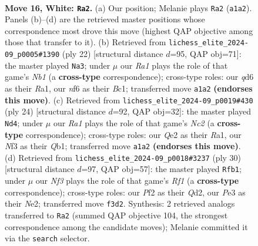 \documentclass[11pt]{article}
\begin{document}
\clearpage

\begin{figure}[p]\centering
\begin{subfigure}{0.46\textwidth}\centering
\resizebox{\linewidth}{!}{%
\newchessgame
\chessboard[
  setfen={rnb1kr2/p3b1pp/1p1q1n2/3p1p2/1p1P3P/P3PNPB/4QP2/RNB1R1K1 w - - 0 16},
  showmover=false,
  pgfstyle=straightmove, color=movearrow, markmove={a1-a2}
]}
\caption{}
\end{subfigure}\hfill
\begin{subfigure}{0.46\textwidth}\centering
\resizebox{\linewidth}{!}{%
\newchessgame
\chessboard[
  setfen={r2qk2r/1b1nbppp/p2ppn2/1p6/P3P3/2PB1N2/1P3PPP/RNBQR1K1 w kq - 1 12},
  showmover=false,
  pgfstyle=straightmove, color=movearrow, markmove={b1-a3}
]}
\caption{}
\end{subfigure}
\\[4pt]
\begin{subfigure}{0.46\textwidth}\centering
\resizebox{\linewidth}{!}{%
\newchessgame
\chessboard[
  setfen={r1b1k1nr/ppp2ppq/3b4/4n2p/2B1pN1P/1P2P3/PBNP1PP1/RQ2K2R w KQkq - 11 13},
  showmover=false,
  pgfstyle=straightmove, color=movearrow, markmove={c2-d4}
]}
\caption{}
\end{subfigure}\hfill
\begin{subfigure}{0.46\textwidth}\centering
\resizebox{\linewidth}{!}{%
\newchessgame
\chessboard[
  setfen={rr6/4ppbk/nq1p1npp/2pP4/4P2P/2N1BP2/PP1QN1P1/R4RK1 w - - 4 16},
  showmover=false,
  pgfstyle=straightmove, color=movearrow, markmove={f1-b1}
]}
\caption{}
\end{subfigure}
\caption{\textbf{Move 16, White: \texttt{Ra2}.} (a) Our position; Melanie plays \texttt{Ra2} (\texttt{a1a2}). Panels (b)--(d) are the retrieved master positions whose correspondence most drove this move (highest QAP objective among those that transfer to it). (b) Retrieved from \texttt{lichess\_elite\_2024-09\_p0005\#1390} (ply 22) [structural distance $d$=95, QAP obj=71]: the master played \texttt{Na3}; under $\mu$ our \emph{Ra1} plays the role of that game's \emph{Nb1} (a \textbf{cross-type} correspondence); cross-type roles: our \emph{q}d6 as their \emph{R}a1, our \emph{n}f6 as their \emph{B}c1; transferred move \texttt{a1a2} \textbf{(endorses this move)}. (c) Retrieved from \texttt{lichess\_elite\_2024-09\_p0019\#430} (ply 24) [structural distance $d$=92, QAP obj=32]: the master played \texttt{Nd4}; under $\mu$ our \emph{Ra1} plays the role of that game's \emph{Nc2} (a \textbf{cross-type} correspondence); cross-type roles: our \emph{Q}e2 as their \emph{R}a1, our \emph{N}f3 as their \emph{Q}b1; transferred move \texttt{a1a2} \textbf{(endorses this move)}. (d) Retrieved from \texttt{lichess\_elite\_2024-09\_p0018\#3237} (ply 30) [structural distance $d$=97, QAP obj=57]: the master played \texttt{Rfb1}; under $\mu$ our \emph{Nf3} plays the role of that game's \emph{Rf1} (a \textbf{cross-type} correspondence); cross-type roles: our \emph{P}f2 as their \emph{Q}d2, our \emph{P}e3 as their \emph{N}e2; transferred move \texttt{f3d2}. Synthesis: 2 retrieved analogs transferred to \texttt{Ra2} (summed QAP objective 104, the strongest correspondence among the candidate moves); Melanie committed it via the \texttt{search} selector.}

\end{figure}
\end{document}

